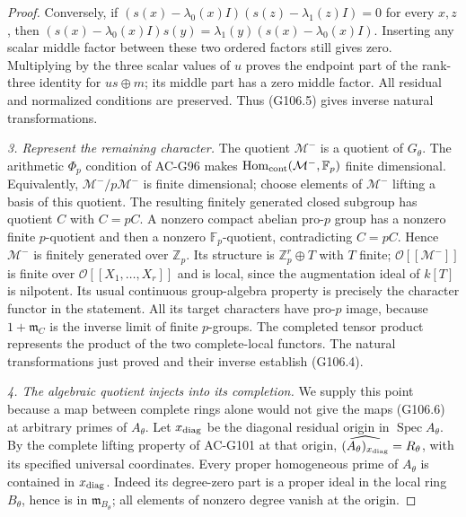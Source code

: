 \begin{proof}
Conversely, if \((s(x)-\lambda_0(x)I)
(s(z)-\lambda_1(z)I)=0\) for every \(x,z\), then
\((s(x)-\lambda_0(x)I)s(y)=\lambda_1(y)
(s(x)-\lambda_0(x)I)\).  Inserting any scalar middle factor
between these two ordered factors still gives zero.  Multiplying
by the three scalar values of \(u\) proves the endpoint part of
the rank-three identity for \(u s\oplus m\); its middle part has
a zero middle factor.  All residual and normalized conditions are
preserved.  Thus (G106.5) gives inverse natural transformations.

\emph{3. Represent the remaining character.}
The quotient \(\mathcal M^-\) is a quotient of \(G_\theta\).
The arithmetic \(\Phi_p\) condition of AC-G96 makes
\(\operatorname{Hom}_{\rm cont}(\mathcal M^-,\mathbb F_p)\)
finite dimensional.  Equivalently, \(\mathcal M^-/p\mathcal M^-\)
is finite dimensional; choose elements of \(\mathcal M^-\) lifting
a basis of this quotient.
The resulting finitely generated closed subgroup has quotient
\(C\) with \(C=pC\).  A nonzero compact abelian pro-\(p\)
group has a nonzero finite \(p\)-quotient and then a nonzero
\(\mathbb F_p\)-quotient, contradicting \(C=pC\).
Hence \(\mathcal M^-\) is finitely generated over \(\mathbb Z_p\).
Its structure is \(\mathbb Z_p^r\oplus T\) with \(T\) finite;
\(\mathcal O[[\mathcal M^-]]\) is finite over
\(\mathcal O[[X_1,\ldots,X_r]]\) and is local, since the
augmentation ideal of \(k[T]\) is nilpotent.
Its usual continuous group-algebra property is precisely the
character functor in the statement.  All its target characters
have pro-\(p\) image, because \(1+\mathfrak m_C\) is the inverse
limit of finite \(p\)-groups.
The completed tensor product represents the product of the two
complete-local functors.  The natural transformations just proved
and their inverse establish (G106.4).

\emph{4. The algebraic quotient injects into its completion.}
We supply this point because a map between complete rings alone
would not give the maps (G106.6) at arbitrary primes of \(A_\theta\).
Let \(x_{\rm diag}\) be the diagonal residual origin in
\(\operatorname{Spec}A_\theta\).  By the complete lifting property
of AC-G101 at that origin,
\(\widehat{(A_\theta)_{x_{\rm diag}}}=R_\theta\), with its
specified universal coordinates.
Every proper homogeneous prime of \(A_\theta\) is contained
in \(x_{\rm diag}\).  Indeed its degree-zero part is a proper
ideal in the local ring \(B_\theta\), hence is in
\(\mathfrak m_{B_\theta}\); all elements of nonzero degree
vanish at the origin.


\end{proof}
